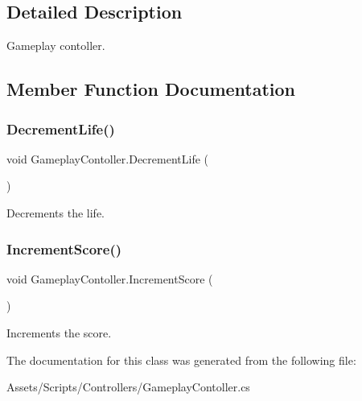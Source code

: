 \subsection{Detailed Description}
Gameplay contoller. 



\subsection{Member Function Documentation}
\mbox{\label{class_gameplay_contoller_a1de279d81704fd5035097275cb2d9519}} 
\subsubsection{\texorpdfstring{Decrement\+Life()}{DecrementLife()}}
{\footnotesize\ttfamily void Gameplay\+Contoller.\+Decrement\+Life (\begin{DoxyParamCaption}{ }\end{DoxyParamCaption})}



Decrements the life. 

\mbox{\label{class_gameplay_contoller_adfd4f2fbd55f084a0f1c5ddc2f5f3af6}} 
\subsubsection{\texorpdfstring{Increment\+Score()}{IncrementScore()}}
{\footnotesize\ttfamily void Gameplay\+Contoller.\+Increment\+Score (\begin{DoxyParamCaption}{ }\end{DoxyParamCaption})}



Increments the score. 



The documentation for this class was generated from the following file\+:\begin{DoxyCompactItemize}
\item 
Assets/\+Scripts/\+Controllers/Gameplay\+Contoller.\+cs\end{DoxyCompactItemize}
